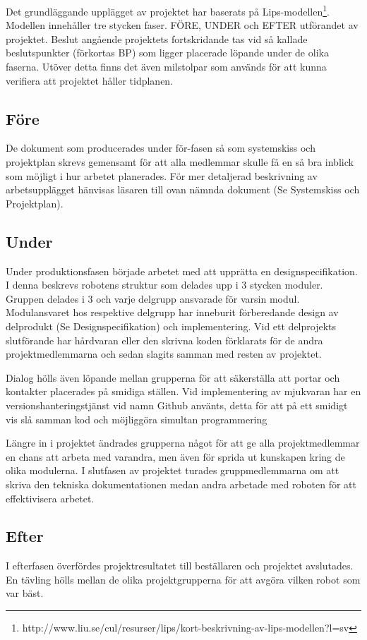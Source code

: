 \documentclass[a4paper,12pt,fleqn]{article}
\begin{document}
Det grundläggande upplägget av projektet har baserats på Lips-modellen\footnote{http://www.liu.se/cul/resurser/lips/kort-beskrivning-av-lips-modellen?l=sv}. Modellen innehåller tre stycken faser. FÖRE, UNDER och EFTER utförandet av projektet. Beslut angående projektets fortskridande tas vid så kallade beslutspunkter (förkortas BP) som ligger placerade löpande under de olika faserna. Utöver detta finns det även milstolpar som används för att kunna verifiera att projektet håller tidplanen. 

\subsection{Före}
De dokument som producerades under för-fasen så som systemskiss och projektplan skrevs gemensamt för att alla medlemmar skulle få en så bra inblick som möjligt i hur arbetet planerades. För mer detaljerad beskrivning av arbetsupplägget hänvisas läsaren till ovan nämnda dokument (Se Systemskiss och Projektplan).

\subsection{Under}
Under produktionsfasen började arbetet med att upprätta en designspecifikation. I denna beskrevs robotens struktur som delades upp i 3 stycken moduler. Gruppen delades i 3 och varje delgrupp ansvarade för varsin modul. Modulansvaret hos respektive delgrupp har inneburit förberedande design av delprodukt (Se Designspecifikation) och implementering. 
Vid ett delprojekts slutförande har hårdvaran eller den skrivna koden förklarats för de andra projektmedlemmarna och sedan slagits samman med resten av projektet. 

Dialog hölls även löpande mellan grupperna för att säkerställa att portar och kontakter placerades på smidiga ställen. Vid implementering av mjukvaran har en versionshanteringstjänst vid namn Github använts, detta för att på ett smidigt vis slå samman kod och möjliggöra simultan programmering

Längre in i projektet ändrades grupperna något för att ge alla projektmedlemmar en chans att arbeta med varandra, men även för sprida ut kunskapen kring de olika modulerna.
I slutfasen av projektet turades gruppmedlemmarna om att skriva den tekniska dokumentationen medan andra arbetade med roboten för att effektivisera arbetet.

\subsection{Efter}
I efterfasen överfördes projektresultatet till beställaren och projektet avslutades. En tävling hölls mellan de olika projektgrupperna för att avgöra vilken robot som var bäst. 
\end{document}
